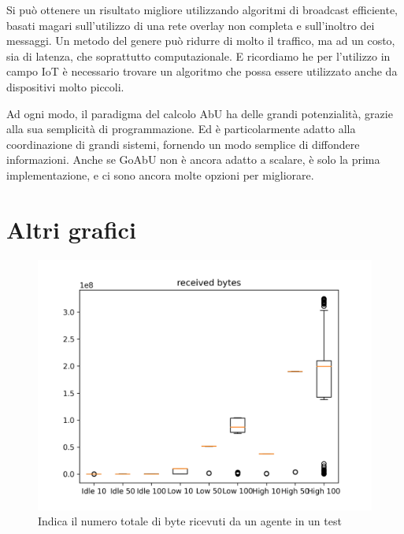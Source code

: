 \documentclass[12pt, a4paper]{article}
\begin{document}
Si può ottenere un risultato migliore utilizzando algoritmi di broadcast efficiente, basati magari sull'utilizzo di una rete overlay non completa e sull'inoltro dei messaggi.
Un metodo del genere può ridurre di molto il traffico, ma ad un costo, sia di latenza, che soprattutto computazionale. E ricordiamo he per l'utilizzo in campo IoT è necessario trovare un algoritmo che possa essere utilizzato anche da dispositivi molto piccoli.

Ad ogni modo, il paradigma del calcolo AbU ha delle grandi potenzialità, grazie alla sua semplicità di programmazione. Ed è particolarmente adatto alla coordinazione di grandi sistemi, fornendo un modo semplice di diffondere informazioni.
Anche se GoAbU non è ancora adatto a scalare, è solo la prima implementazione, e ci sono ancora molte opzioni per migliorare.




\newpage
\appendix

\section{Altri grafici}\label{appendix:grafici}

\begin{figure}[H]
    \includegraphics[width=\linewidth, height=0.35\textheight, keepaspectratio]{graphs/received bytes.png}
    \caption{Indica il numero totale di byte ricevuti da un agente in un test}
    \label{fig:rb}
\end{figure}
\end{document}
